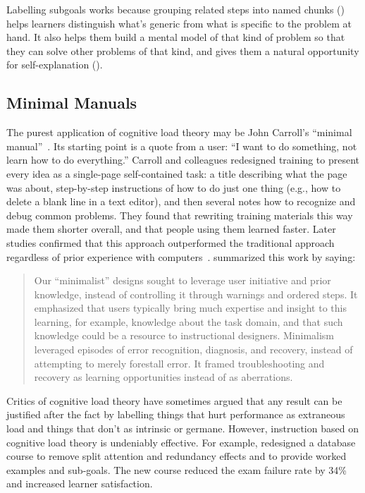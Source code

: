 Labelling subgoals works because grouping related steps into named chunks ()
helps learners distinguish what's generic from what is specific to the problem at hand.
It also helps them build a mental model of that kind of problem
so that they can solve other problems of that kind,
and gives them a natural opportunity for self-explanation ().

\subsection*{Minimal Manuals}

The purest application of cognitive load theory may be John Carroll's ``minimal manual''~\cite{Carr1987,Carr2014}.
Its starting point is a quote from a user:
``I want to do something, not learn how to do everything.''
Carroll and colleagues redesigned training to present every idea as a single-page self-contained task:
a title describing what the page was about,
step-by-step instructions of how to do just one thing
(e.g., how to delete a blank line in a text editor),
and then several notes how to recognize and debug common problems.
They found that rewriting training materials this way made them shorter overall,
and that people using them learned faster.
Later studies confirmed that this approach outperformed the traditional approach
regardless of prior experience with computers~\cite{Lazo1993}.
\cite{Carr2014} summarized this work by saying:

\begin{quote}

  Our ``minimalist'' designs sought to leverage user initiative and prior knowledge,
  instead of controlling it through warnings and ordered steps.
  It emphasized that users typically bring much expertise and insight to this learning,
  for example,
  knowledge about the task domain,
  and that such knowledge could be a resource to instructional designers.
  Minimalism leveraged episodes of error recognition, diagnosis, and recovery,
  instead of attempting to merely forestall error.
  It framed troubleshooting and recovery as learning opportunities instead of as aberrations.

\end{quote}


Critics of cognitive load theory have sometimes argued that
any result can be justified after the fact by labelling things that hurt performance as extraneous load
and things that don't as intrinsic or germane.
However,
instruction based on cognitive load theory is undeniably effective.
For example,
\cite{Maso2016} redesigned a database course to remove split attention and redundancy effects
and to provide worked examples and sub-goals.
The new course reduced the exam failure rate by 34\%
and increased learner satisfaction.

